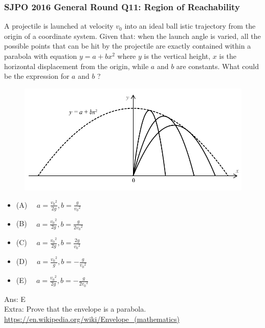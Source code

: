 \documentclass{article}
\begin{document}
\begin{samepage}
\subsubsection{SJPO 2016 General Round Q11: Region of Reachability}
A projectile is launched at velocity $v_0$ into an ideal ball istic trajectory from the origin of a coordinate system. Given that: when the launch angle is varied, all the possible points that can be hit by the projectile are exactly contained within a parabola with equation $y=a+b x^2$ where $y$ is the vertical height, $x$ is the horizontal displacement from the origin, while $a$ and $b$ are constants. What could be the expression for $a$ and $b$ ?\\
 \begin{figure} 
\includegraphics[width=\linewidth]{images/sjpo2016q11.png}
\end{figure}
\begin{itemize}
\item[](A) $\quad a=\frac{v_0{ }^2}{2 g}, b=\frac{g}{v_0{ }^2}$
\item[](B) $\quad a=\frac{v_0{ }^2}{2 g}, b=\frac{g}{2 v_0{ }^2}$
\item[](C) $\quad a=\frac{v_0{ }^2}{2 g}, b=\frac{2 g}{v_0{ }^2}$
\item[](D) $\quad a=\frac{v_0{ }^2}{g}, b=-\frac{g}{v_0{ }^2}$
\item[](E) $\quad a=\frac{v_0{ }^2}{2 g}, b=-\frac{g}{2 v_0{ }^2}$
\end{itemize}
Ans: \ifpaper E \fi \\[10pt]
Extra: Prove that the envelope is a parabola. \url{https://en.wikipedia.org/wiki/Envelope_(mathematics)}
\end{samepage}
\end{document}
